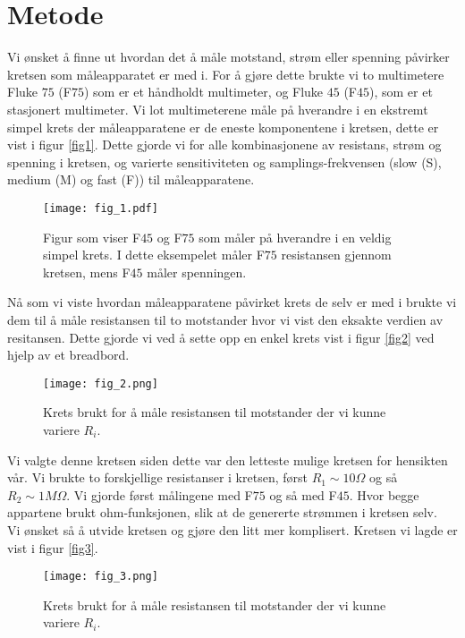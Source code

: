 \documentclass[%
 reprint,
 amsmath,amssymb,
 aps,
]{revtex4-1}
\begin{document}
\section{\label{metode1}Metode}
Vi ønsket å finne ut hvordan det å måle motstand, strøm eller spenning påvirker kretsen som måleapparatet er med i. For å gjøre dette brukte vi to multimetere Fluke $75$ (F$75$) som er et håndholdt multimeter, og Fluke $45$ (F$45$), som er et stasjonert multimeter. Vi lot multimeterene måle på hverandre i en ekstremt simpel krets der måleapparatene er de eneste komponentene i kretsen, dette er vist i figur \vref{fig1}. Dette gjorde vi for alle kombinasjonene av resistans, strøm og spenning i kretsen, og varierte sensitiviteten og samplings-frekvensen (slow (S), medium (M) og fast (F)) til måleapparatene. \\
\begin{figure}[h!]
    \centering
    \texttt{[image: fig\_1.pdf]}
    \caption{Figur som viser F$45$ og F$75$ som måler på hverandre i en veldig simpel krets. I dette eksempelet måler F$75$ resistansen gjennom kretsen, mens F$45$ måler spenningen.}
    \label{fig1}
\end{figure}
Nå som vi viste hvordan måleapparatene påvirket krets de selv er med i brukte vi dem til å måle resistansen til to motstander hvor vi vist den eksakte verdien av resitansen. Dette gjorde vi ved å sette opp en enkel krets vist i figur \vref{fig2} ved hjelp av et breadbord.
\begin{figure}[h!]
    \centering
    \texttt{[image: fig\_2.png]}
    \caption{Krets brukt for å måle resistansen til motstander der vi kunne variere $R_i$.}
    \label{fig2}
\end{figure}
Vi valgte denne kretsen siden dette var den letteste mulige kretsen for hensikten vår. Vi brukte to forskjellige resistanser i kretsen, først $R_1 \sim 10 \Omega$ og så $R_2 \sim 1 M\Omega$. Vi gjorde først målingene med F$75$ og så med F$45$. Hvor begge appartene brukt ohm-funksjonen, slik at de genererte strømmen i kretsen selv.\\
Vi ønsket så å utvide kretsen og gjøre den litt mer komplisert. Kretsen vi lagde er vist i figur \vref{fig3}.
\begin{figure}[h!]
    \centering
    \texttt{[image: fig\_3.png]}
    \caption{Krets brukt for å måle resistansen til motstander der vi kunne variere $R_i$.}
    \label{fig3}
\end{figure}
\end{document}
